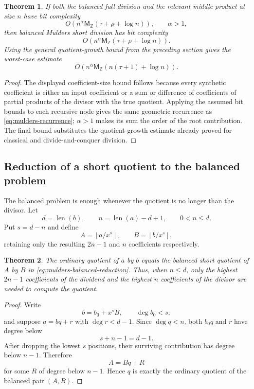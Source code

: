 \documentclass[11pt]{book}
\newtheorem{theorem}{Theorem}[section]
\theoremstyle{definition}
\newcommand{\ZZ}{\mathbb Z}
\newcommand{\len}{\operatorname{len}}
\newcommand{\MZ}{\mathsf M_{\ZZ}}
\begin{document}
\begin{theorem}\label{thm:mulders-bit-complexity}
If both the balanced full division and the relevant middle product at size $n$
have bit complexity
\[
 O\!\left(n^\alpha\MZ(\tau+\rho+\log n)\right),
 \qquad \alpha>1,
\]
then balanced Mulders short division has bit complexity
\[
 O\!\left(n^\alpha\MZ(\tau+\rho+\log n)\right).
\]
Using the general quotient-growth bound from the preceding section gives the
worst-case estimate
\[
 O\!\left(n^\alpha\MZ(n(\tau+1)+\log n)\right).
\]
\end{theorem}

\begin{proof}
The displayed coefficient-size bound follows because every synthetic
coefficient is either an input coefficient or a sum or difference of
coefficients of partial products of the divisor with the true quotient.
Applying the assumed bit bounds to each recursive node gives the same geometric
recurrence as \eqref{eq:mulders-recurrence}; $\alpha>1$ makes its sum the order
of the root contribution.  The final bound substitutes the quotient-growth
estimate already proved for classical and divide-and-conquer division.
\end{proof}

\subsection{Reduction of a short quotient to the balanced problem}

The balanced problem is enough whenever the quotient is no longer than the
divisor.  Let
\[
 d=\len(b),
 \qquad
 n=\len(a)-d+1,
 \qquad
 0<n\leq d.
\]
Put $s=d-n$ and define
\begin{equation}\label{eq:mulders-balanced-reduction}
 A=\left\lfloor a/x^s\right\rfloor,
 \qquad
 B=\left\lfloor b/x^s\right\rfloor,
\end{equation}
retaining only the resulting $2n-1$ and $n$ coefficients respectively.

\begin{theorem}\label{thm:mulders-balanced-reduction}
The ordinary quotient of $a$ by $b$ equals the balanced short quotient of
$A$ by $B$ in \eqref{eq:mulders-balanced-reduction}.  Thus, when $n\leq d$,
only the highest $2n-1$ coefficients of the dividend and the highest $n$
coefficients of the divisor are needed to compute the quotient.
\end{theorem}

\begin{proof}
Write
\[
 b=b_0+x^sB,
 \qquad \deg b_0<s,
\]
and suppose $a=bq+r$ with $\deg r<d-1$.  Since $\deg q<n$, both $b_0q$ and
$r$ have degree below
\[
 s+n-1=d-1.
\]
After dropping the lowest $s$ positions, their surviving contribution has
degree below $n-1$.  Therefore
\[
 A=Bq+R
\]
for some $R$ of degree below $n-1$.  Hence $q$ is exactly the ordinary quotient
of the balanced pair $(A,B)$.
\end{proof}
\end{document}
